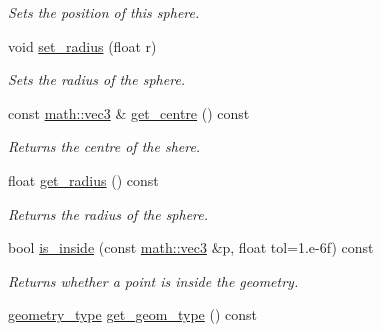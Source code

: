 \begin{DoxyCompactItemize}
\begin{DoxyCompactList}\small\item\em Sets the position of this sphere. \end{DoxyCompactList}\item 
\mbox{\label{classphysim_1_1geometric_1_1sphere_af6d72acf09e24ceed019d12efaf99bef}} 
void \hyperlink{classphysim_1_1geometric_1_1sphere_af6d72acf09e24ceed019d12efaf99bef}{set\+\_\+radius} (float r)
\begin{DoxyCompactList}\small\item\em Sets the radius of the sphere. \end{DoxyCompactList}\item 
\mbox{\label{classphysim_1_1geometric_1_1sphere_a5afdea5ae9d36974b37a3cac7a2783a1}} 
const \hyperlink{structphysim_1_1math_1_1vec3}{math\+::vec3} \& \hyperlink{classphysim_1_1geometric_1_1sphere_a5afdea5ae9d36974b37a3cac7a2783a1}{get\+\_\+centre} () const
\begin{DoxyCompactList}\small\item\em Returns the centre of the shere. \end{DoxyCompactList}\item 
\mbox{\label{classphysim_1_1geometric_1_1sphere_a362e115df6006fedf6e7819f0656ba97}} 
float \hyperlink{classphysim_1_1geometric_1_1sphere_a362e115df6006fedf6e7819f0656ba97}{get\+\_\+radius} () const
\begin{DoxyCompactList}\small\item\em Returns the radius of the sphere. \end{DoxyCompactList}\item 
bool \hyperlink{classphysim_1_1geometric_1_1sphere_a22ca74b7056f85165d80d9913b32bbfb}{is\+\_\+inside} (const \hyperlink{structphysim_1_1math_1_1vec3}{math\+::vec3} \&p, float tol=1.e-\/6f) const
\begin{DoxyCompactList}\small\item\em Returns whether a point is inside the geometry. \end{DoxyCompactList}\item 
\mbox{\label{classphysim_1_1geometric_1_1sphere_a1c94642dfa546b69c5d00693c540ad6c}} 
\hyperlink{namespacephysim_1_1geometric_ac2794fff270c5b2ff4307f107a365fca}{geometry\+\_\+type} \hyperlink{classphysim_1_1geometric_1_1sphere_a1c94642dfa546b69c5d00693c540ad6c}{get\+\_\+geom\+\_\+type} () const

\end{DoxyCompactItemize}
